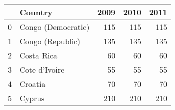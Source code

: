 \begin{tabular}{llrrr}
\toprule
 & Country & 2009 & 2010 & 2011 \\
\midrule
0 & Congo (Democratic) & 115 & 115 & 115 \\
1 & Congo (Republic) & 135 & 135 & 135 \\
2 & Costa Rica & 60 & 60 & 60 \\
3 & Cote d'Ivoire & 55 & 55 & 55 \\
4 & Croatia & 70 & 70 & 70 \\
5 & Cyprus & 210 & 210 & 210 \\
\bottomrule
\end{tabular}
